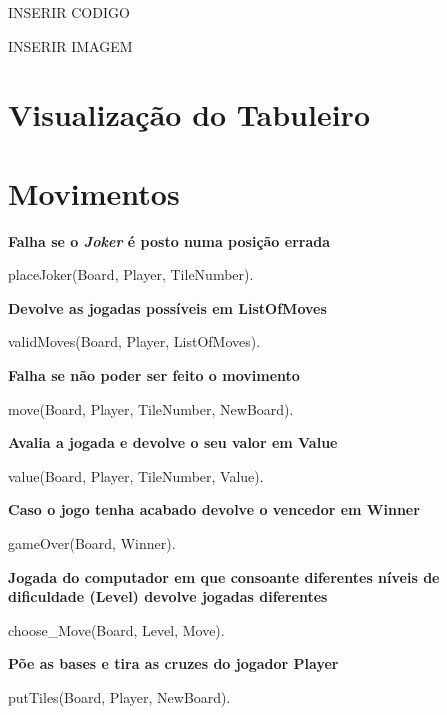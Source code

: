 \documentclass[a4paper]{article}
\begin{document}
INSERIR CODIGO

INSERIR IMAGEM

\section{Visualização do Tabuleiro}




\section{Movimentos}

\textbf{Falha se o \textit{Joker} é posto numa posição errada}\newline
\begin{small}
placeJoker(Board, Player, TileNumber).
\end{small}\newline

\textbf{Devolve as jogadas possíveis em ListOfMoves}\newline
\begin{small}
validMoves(Board, Player, ListOfMoves).
\end{small}\newline

\textbf{Falha se não poder ser feito o movimento}\newline
\begin{small}
move(Board, Player, TileNumber, NewBoard).
\end{small}\newline

\textbf{Avalia a jogada e devolve o seu valor em Value}\newline
\begin{small}
value(Board, Player, TileNumber, Value).
\end{small}\newline

\textbf{Caso o jogo tenha acabado devolve o vencedor em Winner}\newline
\begin{small}
gameOver(Board, Winner).
\end{small}\newline

\textbf{Jogada do computador em que consoante diferentes níveis de dificuldade (Level) devolve jogadas diferentes}\newline
\begin{small}
choose\_Move(Board, Level, Move).
\end{small}\newline

\textbf{Põe as bases e tira as cruzes do jogador Player}\newline
\begin{small}
putTiles(Board, Player, NewBoard).
\end{small}\newline
\end{document}
